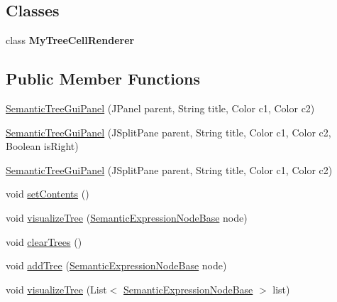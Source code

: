 \subsection*{Classes}
\begin{DoxyCompactItemize}
\item 
class {\bfseries My\-Tree\-Cell\-Renderer}
\end{DoxyCompactItemize}
\subsection*{Public Member Functions}
\begin{DoxyCompactItemize}
\item 
\hyperlink{classit_1_1emarolab_1_1cagg_1_1debugging_1_1baseComponents_1_1customPanel_1_1SemanticTreeGuiPanel_ae681b59399aa250ce8d2658b886a8612}{Semantic\-Tree\-Gui\-Panel} (J\-Panel parent, String title, Color c1, Color c2)
\item 
\hyperlink{classit_1_1emarolab_1_1cagg_1_1debugging_1_1baseComponents_1_1customPanel_1_1SemanticTreeGuiPanel_af080c26e80ca4dd3bcbfdbc27414b576}{Semantic\-Tree\-Gui\-Panel} (J\-Split\-Pane parent, String title, Color c1, Color c2, Boolean is\-Right)
\item 
\hyperlink{classit_1_1emarolab_1_1cagg_1_1debugging_1_1baseComponents_1_1customPanel_1_1SemanticTreeGuiPanel_ad51248e3a4070287af1b2f5b9076423e}{Semantic\-Tree\-Gui\-Panel} (J\-Split\-Pane parent, String title, Color c1, Color c2)
\item 
void \hyperlink{classit_1_1emarolab_1_1cagg_1_1debugging_1_1baseComponents_1_1customPanel_1_1SemanticTreeGuiPanel_a79ec20797259ccf45392565d7d67a914}{set\-Contents} ()
\item 
void \hyperlink{classit_1_1emarolab_1_1cagg_1_1debugging_1_1baseComponents_1_1customPanel_1_1SemanticTreeGuiPanel_a4194cf880fc0ed46acba03883f11c91f}{visualize\-Tree} (\hyperlink{classit_1_1emarolab_1_1cagg_1_1core_1_1evaluation_1_1semanticGrammar_1_1syntaxCompiler_1_1Semantec1f2fc886c35d505e2bc10592e2dff6}{Semantic\-Expression\-Node\-Base} node)
\item 
void \hyperlink{classit_1_1emarolab_1_1cagg_1_1debugging_1_1baseComponents_1_1customPanel_1_1SemanticTreeGuiPanel_a9bfdd191432a4e40f2d6f240b3e38268}{clear\-Trees} ()
\item 
void \hyperlink{classit_1_1emarolab_1_1cagg_1_1debugging_1_1baseComponents_1_1customPanel_1_1SemanticTreeGuiPanel_a122a3adf096499b63e9bc08775aa34b2}{add\-Tree} (\hyperlink{classit_1_1emarolab_1_1cagg_1_1core_1_1evaluation_1_1semanticGrammar_1_1syntaxCompiler_1_1Semantec1f2fc886c35d505e2bc10592e2dff6}{Semantic\-Expression\-Node\-Base} node)
\item 
void \hyperlink{classit_1_1emarolab_1_1cagg_1_1debugging_1_1baseComponents_1_1customPanel_1_1SemanticTreeGuiPanel_ad79050b582acb63fc37dc2e2fa187432}{visualize\-Tree} (List$<$ \hyperlink{classit_1_1emarolab_1_1cagg_1_1core_1_1evaluation_1_1semanticGrammar_1_1syntaxCompiler_1_1Semantec1f2fc886c35d505e2bc10592e2dff6}{Semantic\-Expression\-Node\-Base} $>$ list)
\end{DoxyCompactItemize}

